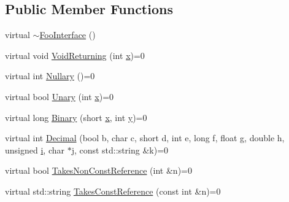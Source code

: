 \subsection*{Public Member Functions}
\begin{DoxyCompactItemize}
\item 
virtual \mbox{\hyperlink{classtesting_1_1gmock__generated__function__mockers__test_1_1_foo_interface_ad4eb4709c9ae9b1cdaded8d05567cdbb}{$\sim$\+Foo\+Interface}} ()
\item 
virtual void \mbox{\hyperlink{classtesting_1_1gmock__generated__function__mockers__test_1_1_foo_interface_adf968115cf1260004d8abe372dc71c85}{Void\+Returning}} (int \mbox{\hyperlink{_obj__test_2lib_2googletest-master_2googlemock_2test_2gmock-matchers__test_8cc_a6150e0515f7202e2fb518f7206ed97dc}{x}})=0
\item 
virtual int \mbox{\hyperlink{classtesting_1_1gmock__generated__function__mockers__test_1_1_foo_interface_a633e753eafa7f82dde22ecf9492f341c}{Nullary}} ()=0
\item 
virtual bool \mbox{\hyperlink{classtesting_1_1gmock__generated__function__mockers__test_1_1_foo_interface_ae0885ac29bc4a3f180f6573d8b1a341e}{Unary}} (int \mbox{\hyperlink{_obj__test_2lib_2googletest-master_2googlemock_2test_2gmock-matchers__test_8cc_a6150e0515f7202e2fb518f7206ed97dc}{x}})=0
\item 
virtual long \mbox{\hyperlink{classtesting_1_1gmock__generated__function__mockers__test_1_1_foo_interface_a59ea28b711ece054ce9d57c2dc574ba0}{Binary}} (short \mbox{\hyperlink{_obj__test_2lib_2googletest-master_2googlemock_2test_2gmock-matchers__test_8cc_a6150e0515f7202e2fb518f7206ed97dc}{x}}, int \mbox{\hyperlink{_obj__test_2lib_2googletest-master_2googlemock_2test_2gmock-matchers__test_8cc_a39cb44155237f0205e0feb931d5acbed}{y}})=0
\item 
virtual int \mbox{\hyperlink{classtesting_1_1gmock__generated__function__mockers__test_1_1_foo_interface_a5a389017205848c7b7055c071cca0c6d}{Decimal}} (bool b, char c, short d, int e, long f, float g, double h, unsigned \mbox{\hyperlink{_obj__test_2lib_2googletest-master_2googlemock_2test_2gmock-matchers__test_8cc_acb559820d9ca11295b4500f179ef6392}{i}}, char $\ast$j, const std\+::string \&k)=0
\item 
virtual bool \mbox{\hyperlink{classtesting_1_1gmock__generated__function__mockers__test_1_1_foo_interface_a694354adfffcee58093298bc12182ff5}{Takes\+Non\+Const\+Reference}} (int \&n)=0
\item 
virtual std\+::string \mbox{\hyperlink{classtesting_1_1gmock__generated__function__mockers__test_1_1_foo_interface_aae85be7a3d1b53625fbeeac4694292d3}{Takes\+Const\+Reference}} (const int \&n)=0

\end{DoxyCompactItemize}
